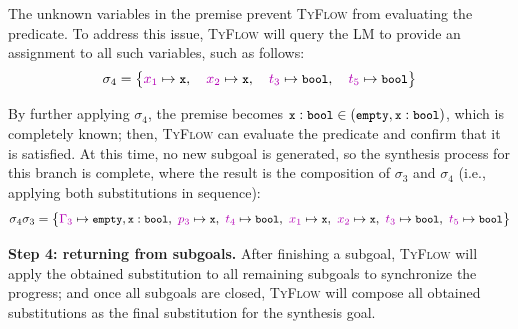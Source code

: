 \documentclass[manuscript,screen]{acmart}
\newcommand{\sk}[1]{\textcolor{skunknown}{#1}}
\newcommand{\toolname}[1]{\textsc{#1}}
\newcommand{\tcode}[1]{{\small \texttt{\spaceskip=0.2em #1}}}
\newcommand{\mainname}{\toolname{TyFlow}\xspace}
\begin{document}
The unknown variables in the premise prevent \mainname from evaluating the predicate. 
%
To address this issue, \mainname will query the LM to provide an assignment to all such variables, such as follows:
\begin{gather}
\sigma_4 = \big\{ \sk{x_1} \mapsto \tcode{x},\quad \sk{x_2} \mapsto \tcode{x},\quad \sk{t_3} \mapsto \tcode{bool},\quad \sk{t_5} \mapsto \tcode{bool} \big\} \label{formula:sig4}
\end{gather}

By further applying $\sigma_4$, the premise becomes $\checkBinding{(\snoc{\tcode{empty}}{\tcode{x}}{\tcode{bool}})}{\tcode{x}}{\tcode{bool}}$, which is completely known; then, \mainname can evaluate the predicate and confirm   that it is satisfied.
%
At this time, no new subgoal is generated, so the synthesis process for this branch is complete, where the result is the composition of $\sigma_3$ and $\sigma_4$ (i.e., applying both substitutions in sequence):
\[
\sigma_4 \sigma_3 = \big\{
\sk{\Gamma_3} \mapsto \snoc{\tcode{empty}}{\tcode{x}}{\tcode{bool}},\ 
\sk{p_3} \mapsto \tcode{x},\ 
\sk{t_4} \mapsto \tcode{bool},\ 
\sk{x_1} \mapsto \tcode{x},\ 
\sk{x_2} \mapsto \tcode{x},\ 
\sk{t_3} \mapsto \tcode{bool},\ 
\sk{t_5} \mapsto \tcode{bool}
\big\}
\]

\smallskip \noindent \textbf{Step 4: returning from subgoals.}
After finishing a subgoal, \mainname will apply the obtained substitution to all remaining subgoals to synchronize the progress; and once all subgoals are closed, \mainname will compose all obtained substitutions as the final substitution for the synthesis goal.
\end{document}
